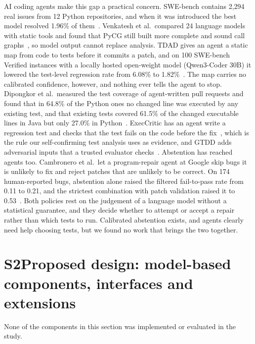 \documentclass[11pt]{article}
\begin{document}
AI coding agents make this gap a practical concern. SWE-bench contains 2,294 real issues from 12 Python repositories, and when it was introduced the best model resolved 1.96\% of them~\cite{jimenez2024swebench}. Venkatesh et al.\ compared 24 language models with static tools and found that PyCG still built more complete and sound call graphs~\cite{venkatesh2025llmcg}, so model output cannot replace analysis. TDAD gives an agent a static map from code to tests before it commits a patch, and on 100 SWE-bench Verified instances with a locally hosted open-weight model (Qwen3-Coder 30B) it lowered the test-level regression rate from 6.08\% to 1.82\%~\cite{alonso2026tdad}. The map carries no calibrated confidence, however, and nothing ever tells the agent to stop. Dipongkor et al.\ measured the test coverage of agent-written pull requests and found that in 64.8\% of the Python ones no changed line was executed by any existing test, and that existing tests covered 61.5\% of the changed executable lines in Java but only 27.0\% in Python~\cite{dipongkor2026agentic}. ExecCritic has an agent write a regression test and checks that the test fails on the code before the fix~\cite{tao2026execcritic}, which is the rule our self-confirming test analysis uses as evidence, and GTDD adds adversarial inputs that a trusted evaluator checks~\cite{kato2026gtdd}. Abstention has reached agents too. Cambronero et al.\ let a program-repair agent at Google skip bugs it is unlikely to fix and reject patches that are unlikely to be correct. On 174 human-reported bugs, abstention alone raised the filtered fail-to-pass rate from 0.11 to 0.21, and the strictest combination with patch validation raised it to 0.53~\cite{cambronero2026abstain}. Both policies rest on the judgement of a language model without a statistical guarantee, and they decide whether to attempt or accept a repair rather than which tests to run. Calibrated abstention exists, and agents clearly need help choosing tests, but we found no work that brings the two together.

\clearpage
\section*{S2\quad Proposed design: model-based components, interfaces and extensions}
None of the components in this section was implemented or evaluated in the study.
\end{document}
